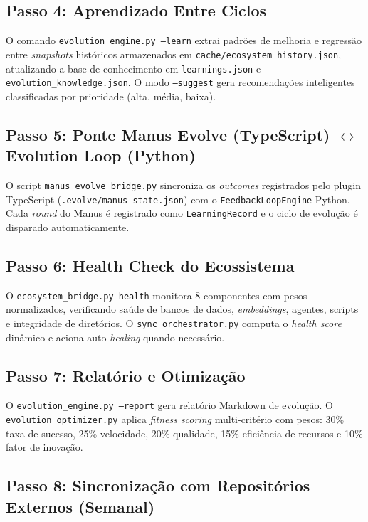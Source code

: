\documentclass[
  article,
  12pt,
  oneside,
  a4paper,
  brazil,
  sumario=tradicional
]{abntex2}
\begin{document}
\subsection{Passo 4: Aprendizado Entre Ciclos}

O comando \texttt{evolution\_engine.py --learn} extrai padrões de melhoria e regressão entre \emph{snapshots} históricos armazenados em \texttt{cache/ecosystem\_history.json}, atualizando a base de conhecimento em \texttt{learnings.json} e \texttt{evolution\_knowledge.json}. O modo \texttt{--suggest} gera recomendações inteligentes classificadas por prioridade (alta, média, baixa).

\subsection{Passo 5: Ponte Manus Evolve (TypeScript) $\leftrightarrow$ Evolution Loop (Python)}

O script \texttt{manus\_evolve\_bridge.py} sincroniza os \emph{outcomes} registrados pelo plugin TypeScript (\texttt{.evolve/manus-state.json}) com o \texttt{FeedbackLoopEngine} Python. Cada \emph{round} do Manus é registrado como \texttt{LearningRecord} e o ciclo de evolução é disparado automaticamente.

\subsection{Passo 6: Health Check do Ecossistema}

O \texttt{ecosystem\_bridge.py health} monitora 8 componentes com pesos normalizados, verificando saúde de bancos de dados, \emph{embeddings}, agentes, scripts e integridade de diretórios. O \texttt{sync\_orchestrator.py} computa o \emph{health score} dinâmico e aciona auto-\emph{healing} quando necessário.

\subsection{Passo 7: Relatório e Otimização}

O \texttt{evolution\_engine.py --report} gera relatório Markdown de evolução. O \texttt{evolution\_optimizer.py} aplica \emph{fitness scoring} multi-critério com pesos: 30\% taxa de sucesso, 25\% velocidade, 20\% qualidade, 15\% eficiência de recursos e 10\% fator de inovação.

\subsection{Passo 8: Sincronização com Repositórios Externos (Semanal)}
\end{document}
